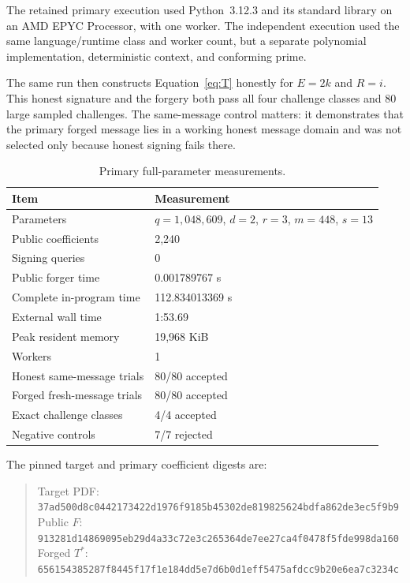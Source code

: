 \documentclass[10pt,a4paper]{article}
\begin{document}
The retained primary execution used Python~3.12.3 and its standard library on
an AMD EPYC Processor, with one worker.  The independent execution used the
same language/runtime class and worker count, but a separate polynomial
implementation, deterministic context, and conforming prime.

The same run then constructs Equation~\eqref{eq:T} honestly for $E=2k$ and
$R=i$.  This honest signature and the forgery both pass all four challenge
classes and 80 large sampled challenges.  The same-message control matters:
it demonstrates that the primary forged message lies in a working honest
message domain and was not selected only because honest signing fails there.

\begin{table}[ht]
\centering
\caption{Primary full-parameter measurements.}
\begin{tabular}{@{}ll@{}}
\toprule
Item & Measurement \\
\midrule
Parameters & $q=1{,}048{,}609$, $d=2$, $r=3$, $m=448$, $s=13$ \\
Public coefficients & 2,240 \\
Signing queries & 0 \\
Public forger time & 0.001789767 s \\
Complete in-program time & 112.834013369 s \\
External wall time & 1:53.69 \\
Peak resident memory & 19,968 KiB \\
Workers & 1 \\
Honest same-message trials & 80/80 accepted \\
Forged fresh-message trials & 80/80 accepted \\
Exact challenge classes & 4/4 accepted \\
Negative controls & 7/7 rejected \\
\bottomrule
\end{tabular}
\end{table}

The pinned target and primary coefficient digests are:
\begin{quote}
\small
Target PDF:\\
\texttt{37ad500d8c0442173422d1976f9185b45302de819825624bdfa862de3ec5f9b9}\\
Public $F$:\\
\texttt{913281d14869095eb29d4a33c72e3c265364de7ee27ca4f0478f5fde998da160}\\
Forged $T^*$:\\
\texttt{656154385287f8445f17f1e184dd5e7d6b0d1eff5475afdcc9b20e6ea7c3234c}
\end{quote}
\end{document}
